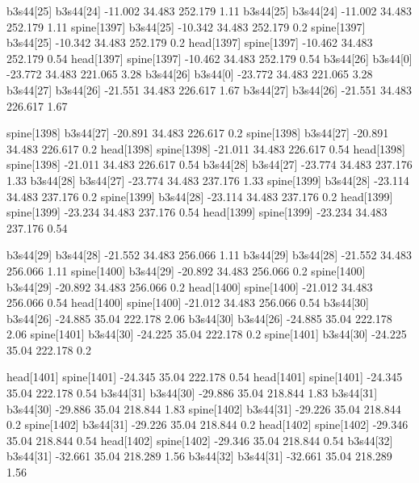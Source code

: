 b3s44[25]    b3s44[24]    -11.002    34.483    252.179    1.11
b3s44[25]    b3s44[24]    -11.002    34.483    252.179    1.11
spine[1397]    b3s44[25]    -10.342    34.483    252.179    0.2
spine[1397]    b3s44[25]    -10.342    34.483    252.179    0.2
head[1397]    spine[1397]    -10.462    34.483    252.179    0.54
head[1397]    spine[1397]    -10.462    34.483    252.179    0.54
b3s44[26]    b3s44[0]    -23.772    34.483    221.065    3.28
b3s44[26]    b3s44[0]    -23.772    34.483    221.065    3.28
b3s44[27]    b3s44[26]    -21.551    34.483    226.617    1.67
b3s44[27]    b3s44[26]    -21.551    34.483    226.617    1.67


spine[1398]    b3s44[27]    -20.891    34.483    226.617    0.2
spine[1398]    b3s44[27]    -20.891    34.483    226.617    0.2
head[1398]    spine[1398]    -21.011    34.483    226.617    0.54
head[1398]    spine[1398]    -21.011    34.483    226.617    0.54
b3s44[28]    b3s44[27]    -23.774    34.483    237.176    1.33
b3s44[28]    b3s44[27]    -23.774    34.483    237.176    1.33
spine[1399]    b3s44[28]    -23.114    34.483    237.176    0.2
spine[1399]    b3s44[28]    -23.114    34.483    237.176    0.2
head[1399]    spine[1399]    -23.234    34.483    237.176    0.54
head[1399]    spine[1399]    -23.234    34.483    237.176    0.54


b3s44[29]    b3s44[28]    -21.552    34.483    256.066    1.11
b3s44[29]    b3s44[28]    -21.552    34.483    256.066    1.11
spine[1400]    b3s44[29]    -20.892    34.483    256.066    0.2
spine[1400]    b3s44[29]    -20.892    34.483    256.066    0.2
head[1400]    spine[1400]    -21.012    34.483    256.066    0.54
head[1400]    spine[1400]    -21.012    34.483    256.066    0.54
b3s44[30]    b3s44[26]    -24.885    35.04    222.178    2.06
b3s44[30]    b3s44[26]    -24.885    35.04    222.178    2.06
spine[1401]    b3s44[30]    -24.225    35.04    222.178    0.2
spine[1401]    b3s44[30]    -24.225    35.04    222.178    0.2


head[1401]    spine[1401]    -24.345    35.04    222.178    0.54
head[1401]    spine[1401]    -24.345    35.04    222.178    0.54
b3s44[31]    b3s44[30]    -29.886    35.04    218.844    1.83
b3s44[31]    b3s44[30]    -29.886    35.04    218.844    1.83
spine[1402]    b3s44[31]    -29.226    35.04    218.844    0.2
spine[1402]    b3s44[31]    -29.226    35.04    218.844    0.2
head[1402]    spine[1402]    -29.346    35.04    218.844    0.54
head[1402]    spine[1402]    -29.346    35.04    218.844    0.54
b3s44[32]    b3s44[31]    -32.661    35.04    218.289    1.56
b3s44[32]    b3s44[31]    -32.661    35.04    218.289    1.56



